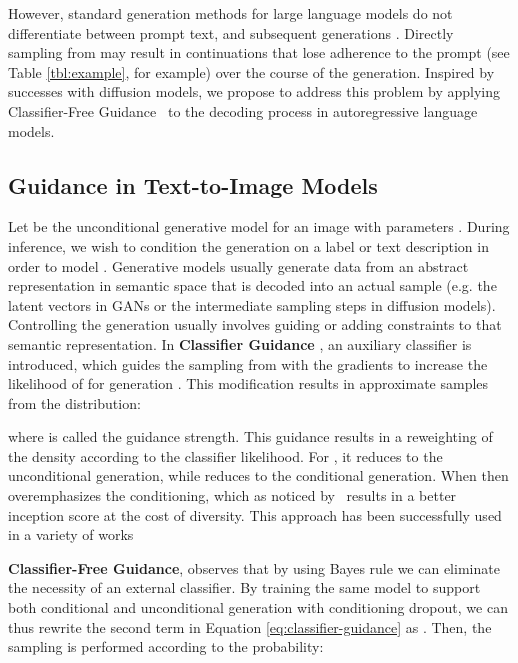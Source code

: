 \documentclass{article}
\begin{document}
However, standard generation methods for large language models do not differentiate between prompt text,  and subsequent generations . Directly sampling from  may result in continuations that lose adherence to the prompt (see Table \ref{tbl:example}, for example) over the course of the generation. 
Inspired by successes with diffusion models, we propose to address this problem by applying Classifier-Free Guidance~\cite{cfg} to the decoding process in autoregressive language models.

\subsection{Guidance in Text-to-Image Models} 
\label{sct:methodology:guidance-t2i}

Let  be the unconditional generative model for an image  with parameters . During inference, we wish to condition the generation on a label or text description  in order to model . Generative models usually generate data from an abstract representation  in semantic space that is decoded into an actual sample (e.g. the latent vectors in GANs or the intermediate sampling steps in diffusion models). Controlling the generation usually involves guiding or adding constraints to that semantic representation.
In \textbf{Classifier Guidance} \cite{guidance}, an auxiliary classifier  is introduced, which guides the sampling from  with the gradients  to increase the likelihood of  for generation .
This modification results in approximate samples from the distribution:


where  is called the guidance strength. This guidance results in a reweighting of the density according to the classifier likelihood. For , it reduces to the unconditional generation, while  reduces to the conditional generation. When  then  overemphasizes the conditioning, which as noticed by~\cite{guidance} results in a better inception score at the cost of diversity. This approach has been successfully used in a variety of works \cite{stylegannada,diffusionclip,vqganclip}

\textbf{Classifier-Free Guidance}, \cite{cfg} observes that by using Bayes rule we can eliminate the necessity of an external classifier. By training the same model  to support both conditional and unconditional generation with conditioning dropout, we can thus rewrite the second term in Equation \ref{eq:classifier-guidance} as . Then, the sampling is performed according to the probability: 

 
\end{document}
